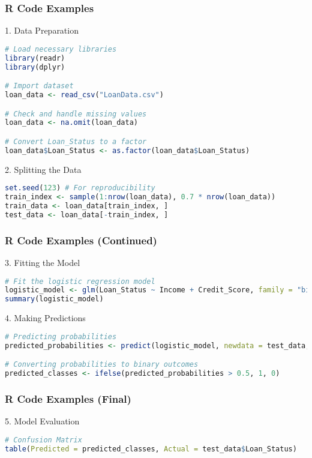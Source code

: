 \documentclass[aspectratio=169]{beamer}
\begin{document}
\begin{frame}[fragile]
    \frametitle{R Code Examples}
    \begin{block}{1. Data Preparation}
    \begin{lstlisting}[language=R]
# Load necessary libraries
library(readr)
library(dplyr)

# Import dataset
loan_data <- read_csv("LoanData.csv")

# Check and handle missing values
loan_data <- na.omit(loan_data)

# Convert Loan_Status to a factor
loan_data$Loan_Status <- as.factor(loan_data$Loan_Status)
    \end{lstlisting}
    \end{block}

    \begin{block}{2. Splitting the Data}
    \begin{lstlisting}[language=R]
set.seed(123) # For reproducibility
train_index <- sample(1:nrow(loan_data), 0.7 * nrow(loan_data))
train_data <- loan_data[train_index, ]
test_data <- loan_data[-train_index, ]
    \end{lstlisting}
    \end{block}
\end{frame}

\begin{frame}[fragile]
    \frametitle{R Code Examples (Continued)}
    \begin{block}{3. Fitting the Model}
    \begin{lstlisting}[language=R]
# Fit the logistic regression model
logistic_model <- glm(Loan_Status ~ Income + Credit_Score, family = "binomial", data = train_data)
summary(logistic_model)
    \end{lstlisting}
    \end{block}

    \begin{block}{4. Making Predictions}
    \begin{lstlisting}[language=R]
# Predicting probabilities
predicted_probabilities <- predict(logistic_model, newdata = test_data, type = "response")

# Converting probabilities to binary outcomes
predicted_classes <- ifelse(predicted_probabilities > 0.5, 1, 0)
    \end{lstlisting}
    \end{block}
\end{frame}

\begin{frame}[fragile]
    \frametitle{R Code Examples (Final)}
    \begin{block}{5. Model Evaluation}
    \begin{lstlisting}[language=R]
# Confusion Matrix
table(Predicted = predicted_classes, Actual = test_data$Loan_Status)
    \end{lstlisting}
    \end{block}
\end{frame}
\end{document}
